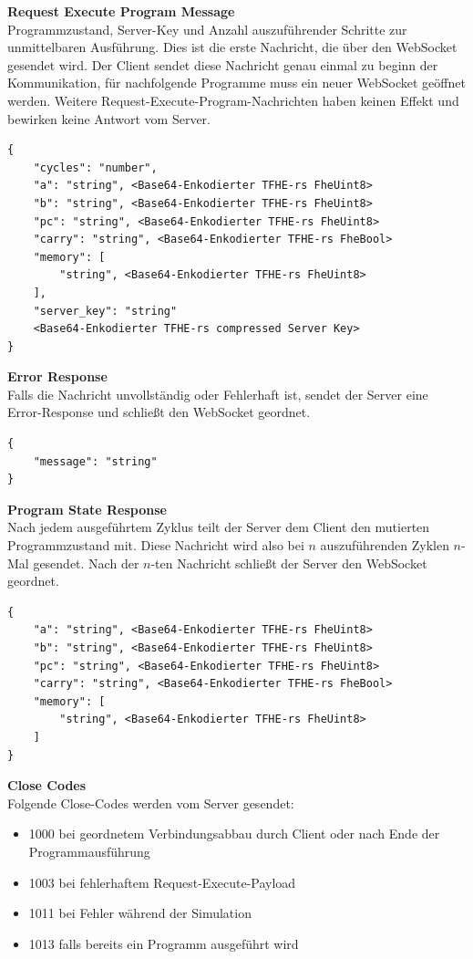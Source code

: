 \textbf{Request Execute Program Message}\\
Programmzustand, Server-Key und Anzahl auszuführender Schritte zur unmittelbaren Ausführung.
Dies ist die erste Nachricht, die über den WebSocket gesendet wird.
Der Client sendet diese Nachricht genau einmal zu beginn der Kommunikation,
für nachfolgende Programme muss ein neuer WebSocket geöffnet werden.
Weitere Request-Execute-Program-Nachrichten haben keinen Effekt und bewirken keine Antwort vom Server.

\begin{lstlisting}[label={lst:message}]
{
    "cycles": "number",
    "a": "string", <Base64-Enkodierter TFHE-rs FheUint8>
    "b": "string", <Base64-Enkodierter TFHE-rs FheUint8>
    "pc": "string", <Base64-Enkodierter TFHE-rs FheUint8>
    "carry": "string", <Base64-Enkodierter TFHE-rs FheBool>
    "memory": [
        "string", <Base64-Enkodierter TFHE-rs FheUint8>
    ],
    "server_key": "string"
    <Base64-Enkodierter TFHE-rs compressed Server Key>
}
\end{lstlisting}

\textbf{Error Response}\\
Falls die Nachricht unvollständig oder Fehlerhaft ist,
sendet der Server eine Error-Response und schließt den WebSocket geordnet.
\begin{lstlisting}[label={lst:error response}]
{
    "message": "string"
}
\end{lstlisting}

\textbf{Program State Response}\\
Nach jedem ausgeführtem Zyklus teilt der Server dem Client den mutierten Programmzustand mit.
Diese Nachricht wird also bei $n$ auszuführenden Zyklen $n$-Mal gesendet.
Nach der $n$-ten Nachricht schließt der Server den WebSocket geordnet.
\begin{lstlisting}[label={lst:state-response}]
{
    "a": "string", <Base64-Enkodierter TFHE-rs FheUint8>
    "b": "string", <Base64-Enkodierter TFHE-rs FheUint8>
    "pc": "string", <Base64-Enkodierter TFHE-rs FheUint8>
    "carry": "string", <Base64-Enkodierter TFHE-rs FheBool>
    "memory": [
        "string", <Base64-Enkodierter TFHE-rs FheUint8>
    ]
}
\end{lstlisting}

\textbf{Close Codes}\\
Folgende Close-Codes werden vom Server gesendet:
\begin{itemize}
    \item 1000 bei geordnetem Verbindungsabbau durch Client oder nach Ende der Programmausführung
    \item 1003 bei fehlerhaftem Request-Execute-Payload
    \item 1011 bei Fehler während der Simulation
    \item 1013 falls bereits ein Programm ausgeführt wird
\end{itemize}

